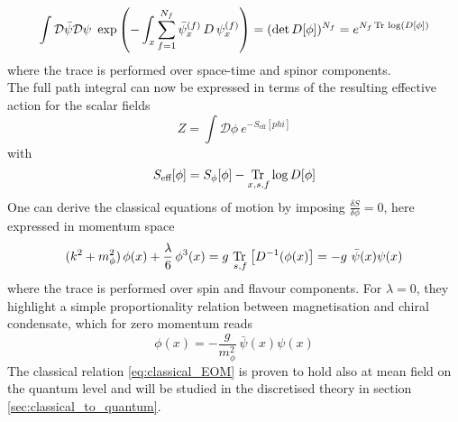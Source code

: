 \begin{equation*}
    \int \mathcal{D} \bar\psi \mathcal{D} \psi \ \exp\left( - \int_x \sum_{f=1}^{N_f} \bar\psi_x^{(f)} \,  D \, \psi_x^{(f)} \right) = (\text{det} \, D[\phi])^{N_f} = e^{N_f\operatorname{\text{Tr} \,} \log (D[\phi])}
\end{equation*}
where the trace is performed over space-time and spinor components. \\ 
The full path integral can now be expressed in terms of the resulting effective action for the scalar fields
\begin{equation*}
    Z = \int \mathcal{D}\phi \ e^{-S_\text{eff}[phi]}
\end{equation*}
with
\begin{equation}
    S_\text{eff}[\phi] = S_{\phi}[\phi] - \underset{x,s,f}{\operatorname{\text{Tr} \,}} \log D[\phi]
    \label{eq:effective_action_no_fermions}
\end{equation}
One can derive the classical equations of motion by imposing $\frac{\delta S}{\delta \phi} = 0$, here expressed in momentum space
\begin{equation*}
     (k^2 + m_\phi^2) \, \phi(x) + \frac{\lambda}{6} \, \phi^3(x) = g \ \underset{s,f}{\tr} \left[D^{-1}(\phi(x)\right] = - g \ \bar\psi(x) \psi(x)
\end{equation*}
where the trace is performed over spin and flavour components. For $\lambda = 0$, they highlight a simple proportionality relation between magnetisation and chiral condensate, which for zero momentum reads
\begin{equation}
    \phi(x) = - \frac{g}{m_\phi^2} \ \bar \psi(x) \psi(x)
    \label{eq:classical_EOM}
\end{equation}
The classical relation \eqref{eq:classical_EOM} is proven to hold also at mean field on the quantum level \cite{Buballa2005NJL-modelMatter} and will be studied in the discretised theory in section \ref{sec:classical_to_quantum}. \\~\\


